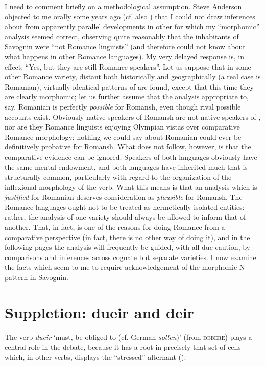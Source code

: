 \documentclass[output=paper,
modfonts
]{LSP/langsci}
\begin{document}
I need to comment briefly on a methodological assumption. Steve Anderson
objected to me orally some years ago (cf. also \citealt[13f.;17]{anderson2011a})
that I could not draw inferences about  from apparently parallel
developments in other  for which my ``morphomic''
analysis seemed correct, observing quite reasonably that the inhabitants
of Savognin were ``not Romance linguists'' (and therefore could not know
about what happens in other Romance languages). My very delayed response
is, in effect: ``Yes, but they are still Romance speakers''. Let us
suppose that in some other Romance variety, distant both historically
and geographically (a real case is Romanian), virtually identical
patterns of  are found, except that this time they are
clearly morphomic; let us further assume that the analysis appropriate
to, say, Romanian is perfectly \emph{possible} for Romansh, even though
rival possible accounts exist. Obviously native speakers of Romansh are
not native speakers of , nor are they Romance linguists enjoying
Olympian vistas over comparative Romance morphology: nothing we could
say about Romanian could ever be definitively probative for Romansh.
What does not follow, however, is that the comparative evidence can be
ignored. Speakers of both languages obviously have the same mental
endowment, and both languages have inherited much that is structurally
common, particularly with regard to the organization of the inflexional
morphology of the verb. What this means is that an analysis which is
\emph{justified} for Romanian deserves consideration as \emph{plausible}
for Romansh. The Romance languages ought not to be treated as
hermetically isolated entities: rather, the analysis of one variety
should always be allowed to inform that of another. That, in fact, is
one of the reasons for doing Romance  from a comparative
perspective (in fact, there is no other way of doing it), and in the
following pages the analysis will frequently be guided, with all due
caution, by comparisons and inferences across cognate but separate
varieties. I now examine the facts which seem to me to require
acknowledgement of the morphomic N-pattern in Savognin.

\section{Suppletion: {dueir} and {deir}}

The verb \emph{dueir} `must, be obliged to (cf. German \emph{sollen})'
(from  \textsc{debere}) plays a central role in the debate, because
it has a  root  in precisely that set of cells which,
in other verbs, displays the ``stressed'' alternant ():
\end{document}
